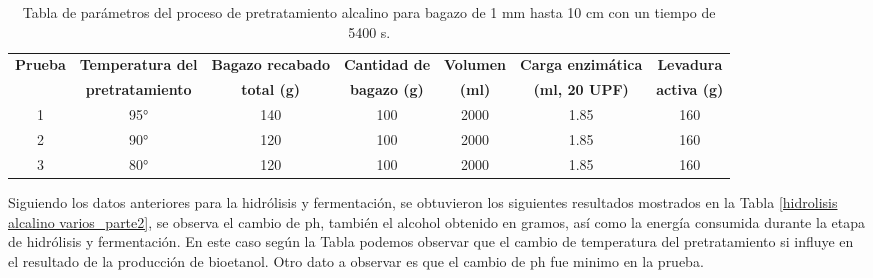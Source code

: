 \documentclass[12pt]{article}
\begin{document}
	
	
	\begin{table}[h!]
		\centering
		\caption{Tabla de parámetros del proceso de pretratamiento alcalino para bagazo de 1 mm hasta 10 cm con un tiempo de 5400 s. }
		\label{hidrolisis alcalino varios_parte1}
		\resizebox{16cm}{!} {
			\begin{tabular}{|c|c|c|c|c|c|c|}
				\hline
				\textbf{Prueba}	& \textbf{Temperatura del} & \textbf{Bagazo recabado} & \textbf{Cantidad de} & \textbf{Volumen} & \textbf{Carga enzimática} & \textbf{Levadura} \\
				&	\textbf{pretratamiento} & \textbf{total (g)} & \textbf{bagazo (g)} & \textbf{(ml)} & \textbf{(ml, 20 UPF)} & \textbf{activa (g)} \\ \hline		
				1	&	95° & 140 & 100 & 2000 & 1.85 & 160 \\ \hline

				2	&	90° & 120 & 100 & 2000 & 1.85 & 160 \\ \hline

						3	&	80° & 120 & 100 & 2000 & 1.85 & 160 \\ \hline

		\end{tabular} }
		
	\end{table}
	
	Siguiendo los datos anteriores para la hidrólisis y fermentación, se obtuvieron los siguientes resultados mostrados en la Tabla \ref{hidrolisis alcalino varios_parte2}, se observa el cambio de ph, también el alcohol obtenido en gramos, así como la energía consumida durante la etapa de hidrólisis y fermentación. En este caso según la Tabla podemos observar que el cambio de temperatura del pretratamiento si influye en el resultado de la producción de bioetanol. Otro dato a observar es que el cambio de ph fue minimo en la prueba.
	
	
	
\end{document}
